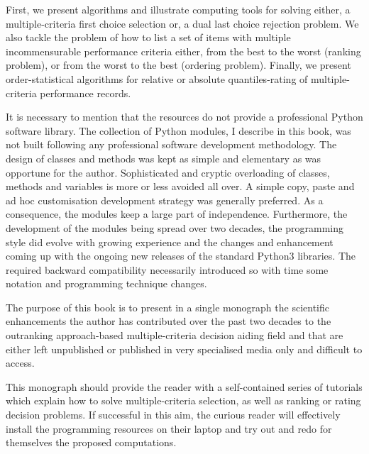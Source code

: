 First, we present algorithms and illustrate computing tools for solving either, a multiple-criteria first choice selection or, a dual last choice rejection problem. We also tackle the problem of how to list a set of items with multiple incommensurable performance criteria either, from the best to the worst (ranking problem), or from the worst to the best (ordering problem). Finally, we present order-statistical algorithms for relative or absolute quantiles-rating of multiple-criteria performance records.

It is necessary to mention that the \Digraph resources do not provide a professional Python software library. The collection of Python modules, I describe in this book, was not built following any professional software development methodology. The design of classes and methods was kept as simple and elementary as was opportune for the author. Sophisticated and cryptic overloading of classes, methods and variables is more or less avoided all over. A simple copy, paste and ad hoc customisation development strategy was generally preferred. As a consequence, the \Digraph modules keep a large part of independence.  Furthermore, the development of the \Digraph modules being spread over two decades, the programming style did evolve with growing experience and the changes and enhancement coming up with the ongoing new releases of the standard Python3 libraries. The required backward compatibility necessarily introduced so with time some notation and programming technique changes.


The purpose of this book is to present in a single monograph the scientific enhancements the author has contributed over the past two decades to the outranking approach-based multiple-criteria decision aiding field and that are either left unpublished or published in very specialised media only and difficult to access.  


This monograph should provide the reader with a self-contained series of tutorials which explain how to solve multiple-criteria selection, as well as ranking or rating decision problems. If successful in this aim, the curious reader will effectively install the \Digraph programming resources on their laptop and try out and redo for themselves the proposed computations.

